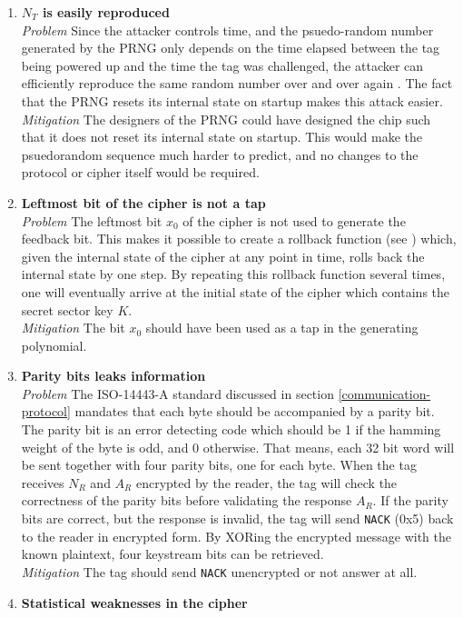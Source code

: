 \documentclass[10pt,twocolumn]{article}
\begin{document}
\begin{enumerate}
    \item \textbf{$N_T$ is easily reproduced}\\
    \textit{Problem} Since the attacker controls time, and the psuedo-random number generated by the PRNG only depends on the time elapsed between the tag being powered up and the time the tag was challenged, the attacker can efficiently reproduce the same random number over and over again \cite{nohl08_yt}. The fact that the PRNG resets its internal state on startup makes this attack easier.\\
    \textit{Mitigation} The designers of the PRNG could have designed the chip such that it does not reset its internal state on startup. This would make the psuedorandom sequence much harder to predict, and no changes to the protocol or cipher itself would be required.
    \item \textbf{Leftmost bit of the cipher is not a tap}\\
    \textit{Problem} The leftmost bit $x_0$ of the cipher is not used to generate the feedback bit. This makes it possible to create a rollback function (see \cite{garcia09}) which, given the internal state of the cipher at any point in time, rolls back the internal state by one step. By repeating this rollback function several times, one will eventually arrive at the initial state of the cipher which contains the secret sector key $K$.\\
    \textit{Mitigation} The bit $x_0$ should have been used as a tap in the generating polynomial.
    \item \textbf{Parity bits leaks information}\\
    \textit{Problem} The ISO-14443-A standard discussed in section \ref{communication-protocol} mandates that each byte should be accompanied by a parity bit. The parity bit is an error detecting code which should be 1 if the hamming weight of the byte is odd, and 0 otherwise. That means, each 32 bit word will be sent together with four parity bits, one for each byte. When the tag receives $N_R$ and $A_R$ encrypted by the reader, the tag will check the correctness of the parity bits before validating the response $A_R$. If the parity bits are correct, but the response is invalid, the tag will send \verb!NACK! (0x5) back to the reader in encrypted form. By XORing the encrypted message with the known plaintext, four keystream bits can be retrieved.\\
    \textit{Mitigation} The tag should send \verb!NACK! unencrypted or not answer at all.
    \item \textbf{Statistical weaknesses in the cipher}\\

\end{enumerate}
\end{document}
